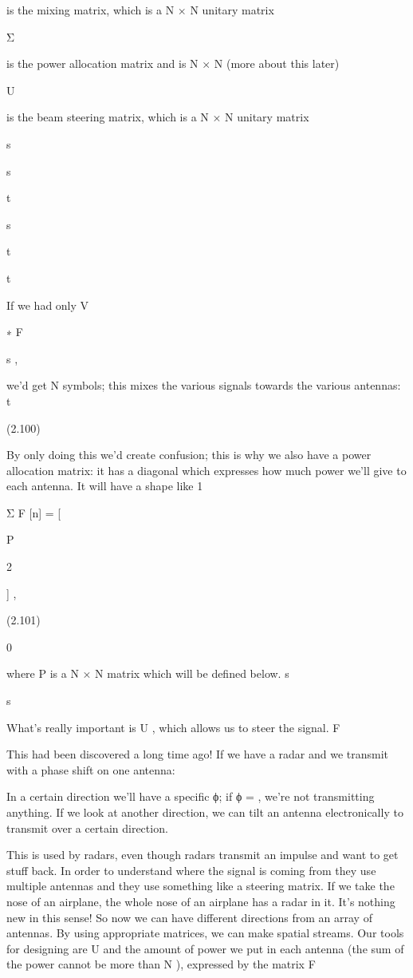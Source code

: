 {is the mixing matrix, which is a N × N unitary matrix

Σ

is the power allocation matrix and is N × N (more about this later)

U

is the beam steering matrix, which is a N × N unitary matrix

s

s

t

s

t

t

If we had only V

∗
F

s ,

we'd get N symbols; this mixes the various signals towards the various antennas:
t

(2.100)

By only doing this we'd create confusion; this is why we also have a power allocation matrix: it has a diagonal which expresses how much power we'll give to each antenna.
It will have a shape like 1

Σ F [n] = [

P

2

] ,

(2.101)

0

where P is a N × N matrix which will be defined below.
s

s

What's really important is U , which allows us to steer the signal.
F

This had been discovered a long time ago! If we have a radar and we transmit with a phase shift on one antenna:

In a certain direction we'll have a specific ϕ; if ϕ = \pi, we're not transmitting anything.
If we look at another direction, we can tilt an antenna electronically to transmit over a certain direction.

This is used by radars, even though radars transmit an impulse and want to get stuff back. In order to understand where the signal is coming from they use multiple antennas and they use something like a steering matrix.
If we take the nose of an airplane, the whole nose of an airplane has a radar in it.
It's nothing new in this sense!
So now we can have different directions from an array of antennas.
By using appropriate matrices, we can make spatial streams.
Our tools for designing are U and the amount of power we put in each antenna (the sum of the power cannot be more than N ), expressed by the matrix F

}
